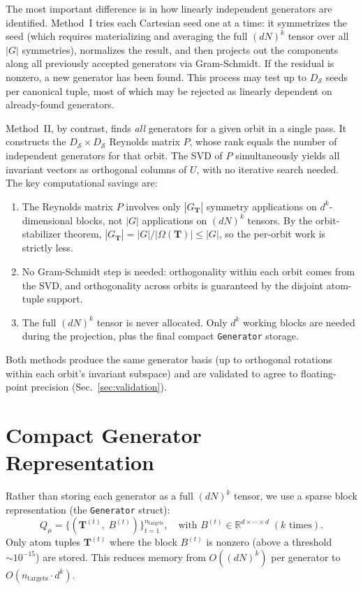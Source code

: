 \documentclass[twocolumn,amsmath,amssymb,aps,prb,10pt,floatfix]{revtex4-2}
\newcommand{\vT}{\mathbf{T}}
\begin{document}
The most important difference is in how linearly independent generators are identified.
Method~I tries each Cartesian seed one at a time: it symmetrizes the seed (which requires materializing and averaging the full $(dN)^k$ tensor over all $|G|$ symmetries), normalizes the result, and then projects out the components along all previously accepted generators via Gram-Schmidt.
If the residual is nonzero, a new generator has been found.
This process may test up to $D_{\mathcal{S}}$ seeds per canonical tuple, most of which may be rejected as linearly dependent on already-found generators.

Method~II, by contrast, finds \emph{all} generators for a given orbit in a single pass.
It constructs the $D_{\mathcal{S}} \times D_{\mathcal{S}}$ Reynolds matrix $P$, whose rank equals the number of independent generators for that orbit.
The SVD of $P$ simultaneously yields all invariant vectors as orthogonal columns of $U$, with no iterative search needed.
The key computational savings are:
\begin{enumerate}
\item The Reynolds matrix $P$ involves only $|G_{\vT}|$ symmetry applications on $d^k$-dimensional blocks, not $|G|$ applications on $(dN)^k$ tensors.
By the orbit-stabilizer theorem, $|G_{\vT}| = |G|/|\Omega(\vT)| \leq |G|$, so the per-orbit work is strictly less.
\item No Gram-Schmidt step is needed: orthogonality within each orbit comes from the SVD, and orthogonality across orbits is guaranteed by the disjoint atom-tuple support.
\item The full $(dN)^k$ tensor is never allocated.
Only $d^k$ working blocks are needed during the projection, plus the final compact \texttt{Generator} storage.
\end{enumerate}

Both methods produce the same generator basis (up to orthogonal rotations within each orbit's invariant subspace) and are validated to agree to floating-point precision (Sec.~\ref{sec:validation}).


\section{Compact Generator Representation}
\label{sec:compact}

Rather than storing each generator as a full $(dN)^k$ tensor, we use a sparse block representation (the \texttt{Generator} struct):
\begin{equation}
Q_\mu = \bigl\{
  (\vT^{(t)},\; B^{(t)})
\bigr\}_{t=1}^{n_{\mathrm{targets}}},
\quad
\text{with } B^{(t)} \in \mathbb{R}^{d \times \cdots \times d}\; (k \text{ times}).
\label{eq:generator_struct}
\end{equation}
Only atom tuples $\vT^{(t)}$ where the block $B^{(t)}$ is nonzero (above a threshold $\sim 10^{-15}$) are stored.
This reduces memory from $O((dN)^k)$ per generator to $O(n_{\mathrm{targets}} \cdot d^k)$.
\end{document}
